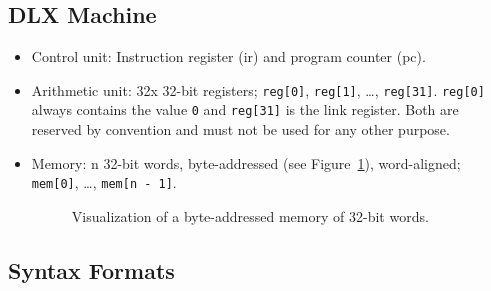 \subsection*{DLX Machine}

\par{
	\noindent
	\parskip0pt\begin{itemize}
		\item{Control unit: \newline
			Instruction register (ir) and program counter (pc).
		}
		\item{Arithmetic unit: \newline
			32x 32-bit registers; \texttt{reg[0]}, \texttt{reg[1]}, \ldots, \texttt{reg[31]}. \texttt{reg[0]} always contains the value \texttt{0} and \texttt{reg[31]} is the link register. Both are reserved by convention and must not be used for any other purpose.
		}
		\item{Memory: \newline
			n 32-bit words, byte-addressed (see Figure~\ref{fig:byteaddressedvisualization}), word-aligned; \newline \texttt{mem[0]}, \ldots, \texttt{mem[n - 1]}.
			\begin{figure}[!htb]
				\centering
				\caption{Visualization of a byte-addressed memory of 32-bit words.}
				\label{fig:byteaddressedvisualization}
			\end{figure}
		}
	\end{itemize}
}

\clearpage

\subsection*{Syntax Formats}

